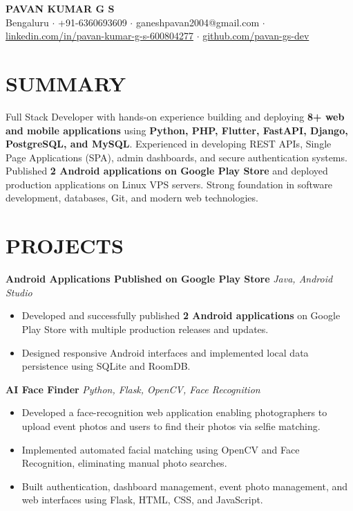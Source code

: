 \documentclass[10pt,a4paper]{article}
\begin{document}

\begin{center}
{\Huge \textbf{PAVAN KUMAR G S}}\\[2pt]

Bengaluru $\cdot$
+91-6360693609 $\cdot$
ganeshpavan2004@gmail.com $\cdot$
\href{https://linkedin.com/in/pavan-kumar-g-s-600804277}{linkedin.com/in/pavan-kumar-g-s-600804277}
$\cdot$
\href{https://github.com/pavan-gs-dev}{github.com/pavan-gs-dev}

\end{center}


\section*{SUMMARY}

Full Stack Developer with hands-on experience building and deploying \textbf{8+ web and mobile applications} using \textbf{Python, PHP, Flutter, FastAPI, Django, PostgreSQL, and MySQL}. Experienced in developing REST APIs, Single Page Applications (SPA), admin dashboards, and secure authentication systems. Published \textbf{2 Android applications on Google Play Store} and deployed production applications on Linux VPS servers. Strong foundation in software development, databases, Git, and modern web technologies.


\section*{PROJECTS}

\textbf{Android Applications Published on Google Play Store}
\hfill \textit{Java, Android Studio}

\begin{itemize}
\item Developed and successfully published \textbf{2 Android applications} on Google Play Store with multiple production releases and updates.
\item Designed responsive Android interfaces and implemented local data persistence using SQLite and RoomDB.
\end{itemize}

\textbf{AI Face Finder}
\hfill \textit{Python, Flask, OpenCV, Face Recognition}

\begin{itemize}
\item Developed a face-recognition web application enabling photographers to upload event photos and users to find their photos via selfie matching.
\item Implemented automated facial matching using OpenCV and Face Recognition, eliminating manual photo searches.
\item Built authentication, dashboard management, event photo management, and web interfaces using Flask, HTML, CSS, and JavaScript.
\end{itemize}
\end{document}
